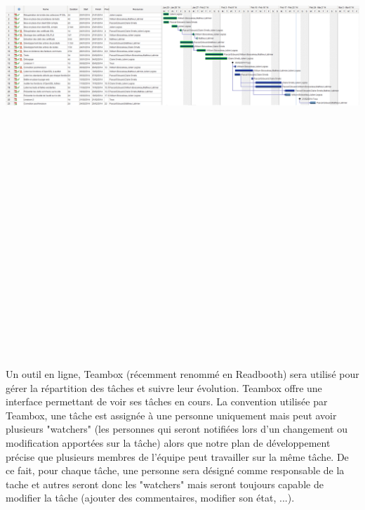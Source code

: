 \documentclass[a4paper,11pt,french]{article}
\begin{document}
\begin{center}
\includegraphics[angle=90,height=22.5cm]{gantt-chart_v1.png}
\end{center}

\newpage



Un outil en ligne, Teambox (récemment renommé en Readbooth) sera utilisé pour gérer la répartition des tâches et suivre leur évolution. Teambox offre une interface permettant de voir ses tâches en cours. La convention utilisée par Teambox, une tâche est assignée à une personne uniquement mais peut avoir plusieurs "watchers" (les personnes qui seront notifiées lors d'un changement ou modification apportées sur la tâche) alors que notre plan de développement précise que plusieurs membres de l'équipe peut travailler sur la même tâche. De ce fait, pour chaque tâche, une personne sera désigné comme responsable de la tache et autres seront donc les "watchers" mais seront toujours capable de modifier la tâche (ajouter des commentaires, modifier son état, ...).
\end{document}
